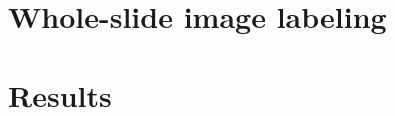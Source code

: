 \documentclass[journal]{IEEEtran}
\begin{document}
%




\section{Whole-slide image labeling}

\section{Results}
\end{document}
